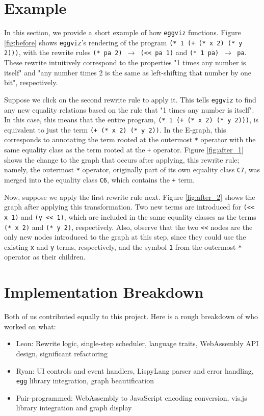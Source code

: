 \documentclass[letterpaper,twocolumn,11pt]{article}
\begin{document}
\section{Example}

In this section, we provide a short example of how \texttt{eggviz}
functions. Figure \ref{fig:before} shows \texttt{eggviz}'s rendering of the
program \texttt{(* 1 (+ (* x 2) (* y 2)))}, with the rewrite rules \texttt{(* pa
  2) $\rightarrow$ (<< pa 1)} and \texttt{(* 1 pa) $\rightarrow$ pa}. These
rewrite intuitively correspond to the properties "1 times any number is itself"
and "any number times 2 is the same as left-shifting that number by one bit",
respectively.

Suppose we click on the second rewrite rule to apply it. This tells
\texttt{eggviz} to find any new equality relations based on the rule that "1
times any number is itself". In this case, this means that the entire program,
\texttt{(* 1 (+ (* x 2) (* y 2)))}, is equivalent to just the term \texttt{(+ (*
  x 2) (* y 2))}. In the E-graph, this corresponds to annotating the term rooted
at the outermost \texttt{*} operator with the same equality class as the term
rooted at the \texttt{+} operator. Figure \ref{fig:after_1} shows the change to
the graph that occurs after applying, this rewrite rule; namely, the outermost
\texttt{*} operator, originally part of its own equality class \texttt{C7}, was
merged into the equality class \texttt{C6}, which contains the \texttt{+} term.

Now, suppose we apply the first rewrite rule next. Figure \ref{fig:after_2}
shows the graph after applying this transformation. Two new terms are introduced
for \texttt{(<< x 1)} and \texttt{(y << 1)}, which are included in the same
equality classes as the terms \texttt{(* x 2)} and \texttt{(* y 2)},
respectively. Also, observe that the two \texttt{<<} nodes are the only new
nodes introduced to the graph at this step, since they could use the existing
\texttt{x} and \texttt{y} terms, respectively, and the symbol \texttt{1} from
the outermost \texttt{*} operator as their children.

\section{Implementation Breakdown}

Both of us contributed equally to this project. Here is a rough breakdown of who
worked on what:
\begin{itemize}
    \item Leon: Rewrite logic, single-step scheduler, language traits,
      WebAssembly API design, significant refactoring
    \item Ryan: UI controls and event handlers, LispyLang parser and error
      handling, \texttt{egg} library integration, graph beautification
    \item Pair-programmed: WebAssembly to JavaScript encoding conversion, vis.js
      library integration and graph display
\end{itemize}
\end{document}
